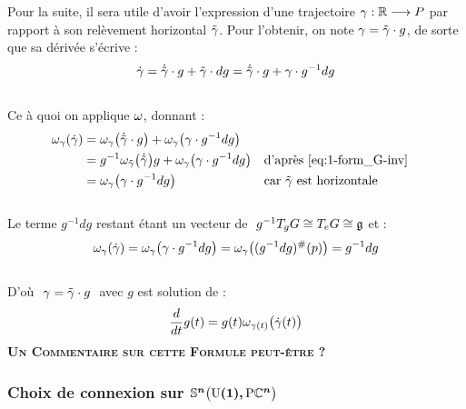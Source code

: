 Pour la suite, il sera utile d'avoir l'expression d'une trajectoire $\gamma:\mathbb{R}\longrightarrow P$ par rapport à son relèvement horizontal $\Tilde{\gamma}$. Pour l'obtenir, on note  $\gamma = \Tilde{\gamma}\cdot g$, de sorte que sa dérivée s'écrive :
\[\dot{\gamma} = \dot{\Tilde{\gamma}}\cdot g + \Tilde{\gamma}\cdot dg = \dot{\Tilde{\gamma}}\cdot g + \gamma \cdot g^{-1}dg\]
\\
Ce à quoi on applique $\omega$, donnant :
\begin{align*}
	\omega_\gamma(\dot{\gamma}) &= \omega_\gamma\big( \dot{\Tilde{\gamma}}\cdot g \big) + \omega_\gamma \big( \gamma \cdot g^{-1}dg \big) \\
	&= g^{-1}\omega_{\Tilde{\gamma}}\big(\dot{\Tilde{\gamma}} \big) g + \omega_\gamma \big( \gamma \cdot g^{-1}dg \big)   &  &\text{d'après \eqref{eq:1-form_G-inv}} \\
	&= \omega_\gamma \big( \gamma \cdot g^{-1}dg \big)  &  &\text{car $\Tilde{\gamma}$ est horizontale}
\end{align*}
\\
Le terme $g^{-1}dg$ restant étant un vecteur de $\ g^{-1}\tg[g]{G}\cong \tg[e]{G}\cong \mathfrak{g}$ et :
\[\omega_\gamma(\dot{\gamma}) = \omega_\gamma \big( \gamma \cdot g^{-1}dg \big) = \omega_\gamma \big( (g^{-1}dg)^\#(p) \big) = g^{-1}dg\]
\\
D'où $\ \gamma = \Tilde{\gamma}\cdot g\ $ avec $g$ est solution de :
\begin{equation} \label{eq:deviation2hozi}
	\frac{d}{dt}g(t)  = g(t) \omega_{\gamma(t)}\big( \dot{\gamma}(t) \big)
\end{equation}
\skipl
\textbf{\textsc{\color{red}Un Commentaire sur cette Formule peut-être ?}}



\subsubsection{Choix de connexion sur $\boldsymbol{\mathbb{ S}^{n}\big(\text{\normalfont U}(1),\text{\normalfont P}\mathbb{C}^{n}\big)}$}\label{subsec:conn2SUPC}

